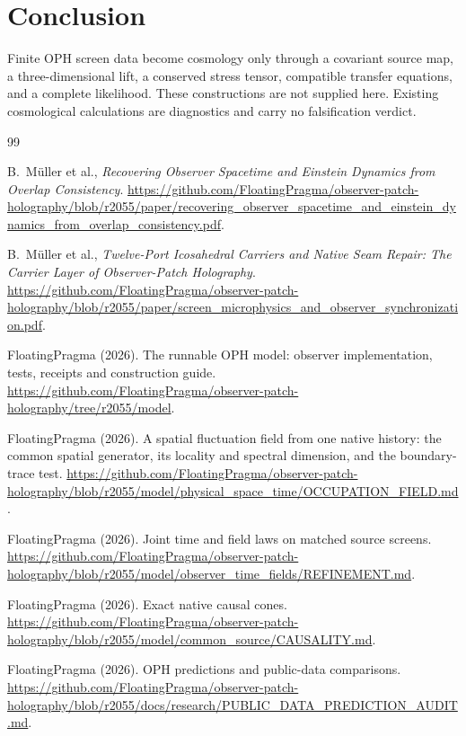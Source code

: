 \documentclass[11pt]{article}
\theoremstyle{remark}
\begin{document}
\section{Conclusion}

Finite OPH screen data become cosmology only through a covariant source map,
a three-dimensional lift, a conserved stress tensor, compatible transfer
equations, and a complete likelihood. These constructions are not supplied here.
Existing cosmological calculations are diagnostics and carry no falsification
verdict.

\begin{thebibliography}{99}

B.~M\"uller et al.,
\emph{Recovering Observer Spacetime and Einstein Dynamics from Overlap Consistency}.
\url{https://github.com/FloatingPragma/observer-patch-holography/blob/r2055/paper/recovering_observer_spacetime_and_einstein_dynamics_from_overlap_consistency.pdf}.

B.~M\"uller et al.,
\emph{Twelve-Port Icosahedral Carriers and Native Seam Repair: The Carrier Layer of Observer-Patch Holography}.
\url{https://github.com/FloatingPragma/observer-patch-holography/blob/r2055/paper/screen_microphysics_and_observer_synchronization.pdf}.

FloatingPragma (2026). The runnable OPH model: observer implementation,
tests, receipts and construction guide.
\url{https://github.com/FloatingPragma/observer-patch-holography/tree/r2055/model}.

FloatingPragma (2026). A spatial fluctuation field from one native history:
the common spatial generator, its locality and spectral dimension, and the
boundary-trace test.
\url{https://github.com/FloatingPragma/observer-patch-holography/blob/r2055/model/physical_space_time/OCCUPATION_FIELD.md}.

FloatingPragma (2026). Joint time and field laws on matched source screens.
\url{https://github.com/FloatingPragma/observer-patch-holography/blob/r2055/model/observer_time_fields/REFINEMENT.md}.

FloatingPragma (2026). Exact native causal cones.
\url{https://github.com/FloatingPragma/observer-patch-holography/blob/r2055/model/common_source/CAUSALITY.md}.

FloatingPragma (2026). OPH predictions and public-data comparisons.
\url{https://github.com/FloatingPragma/observer-patch-holography/blob/r2055/docs/research/PUBLIC_DATA_PREDICTION_AUDIT.md}.


\end{thebibliography}
\end{document}
